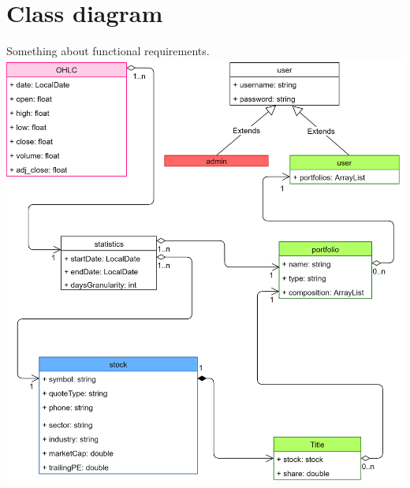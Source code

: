 \section{Class diagram}
Something about functional requirements.\\
\includegraphics[scale=0.20]{img/design_class_diagram_duc.png}

